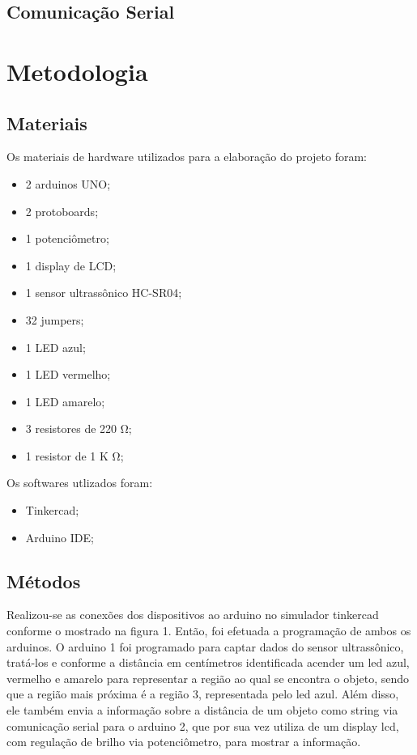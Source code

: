 \documentclass[conference]{IEEEtran}
\begin{document}
\subsection{Comunicação Serial}

\section{Metodologia}

\subsection{Materiais}
Os materiais de hardware utilizados para a elaboração do projeto foram:
\begin{itemize}
    \item 2 arduinos UNO;
    \item 2 protoboards;
    \item 1 potenciômetro;
    \item 1 display de LCD;
    \item 1 sensor ultrassônico HC-SR04;
    \item 32 jumpers;
    \item 1 LED azul;
    \item 1 LED vermelho;
    \item 1 LED amarelo;
    \item 3 resistores de 220 \si{\ohm};
    \item 1 resistor de 1 K \si{\ohm};
\end{itemize}
Os softwares utlizados foram:
\begin{itemize}
    \item Tinkercad;
    \item Arduino IDE;
\end{itemize}

\subsection{Métodos}

Realizou-se as conexões dos dispositivos ao arduino no simulador tinkercad conforme o mostrado na figura 1.
Então, foi efetuada a programação de ambos os arduinos. O arduino 1 foi programado para captar dados do sensor ultrassônico, tratá-los
e conforme a distância em centímetros identificada acender um led azul, vermelho e amarelo para representar a região ao qual se encontra o objeto, sendo que a região mais próxima é a região 3, representada pelo led azul.
Além disso, ele também envia a informação sobre a distância de um objeto como string via comunicação serial para o arduino 2, que por sua vez utiliza de um display lcd, com regulação de brilho via potenciômetro, para mostrar a informação.
\end{document}
